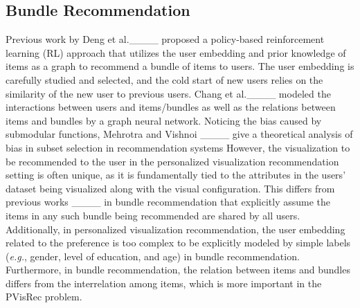 \subsection{Bundle Recommendation}
Previous work by Deng et al.____ proposed a policy-based reinforcement learning (RL) approach that utilizes the user embedding and prior knowledge of items as a graph to recommend a bundle of items to users.
The user embedding is carefully studied and selected, and the cold start of new users relies on the similarity of the new user to previous users.
Chang et al.____ modeled the interactions between users and items/bundles as well as the relations between items and bundles by a graph neural network. Noticing the bias caused by submodular functions, Mehrotra and Vishnoi ____ give a theoretical analysis of bias in subset selection in recommendation systems
However, the visualization to be recommended to the user in the personalized visualization recommendation setting is often unique, as it is fundamentally tied to the attributes in the users' dataset being visualized along with the visual configuration.
This differs from previous works ____ in bundle recommendation that explicitly assume the items in any such bundle being recommended are shared by all users.
Additionally, in personalized visualization recommendation, the user embedding related to the preference is too complex to be explicitly modeled by simple labels (\emph{e.g.}, gender, level of education, and age) in bundle recommendation. 
Furthermore, in bundle recommendation, the relation between items and bundles differs from the interrelation among items, which is more important in the PVisRec problem.
